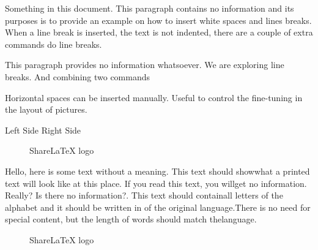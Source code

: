 \documentclass{article}
\begin{document}
Something in this document. This paragraph contains no information and its purposes is to provide an example on how to insert white spaces and lines breaks.\\ %
When a line break is inserted, the text is not indented, there are a couple of extra commands do line breaks. \newline %



This paragraph provides no information whatsoever. We are exploring line breaks. \hfill \break %
And combining two commands

\vspace{5mm} %

Horizontal \hspace{1cm} spaces can be inserted manually. Useful to control the fine-tuning in the layout of pictures.

Left Side \hfill Right Side




\vspace{5mm} %

\begin{figure}
\centering

\caption{ShareLaTeX logo}
\end{figure}

Hello,  here  is  some  text  without  a  meaning.   This  text  should  showwhat a printed text will look like at this place.  If you read this text, you willget  no  information.   Really?   Is  there  no  information?.  This text should containall letters of the alphabet and it should be written in of the original language.There is no need for special content, but the length of words should match thelanguage.

\begin{figure}[b]
\centering

\caption{ShareLaTeX logo}
\end{figure}
\end{document}
